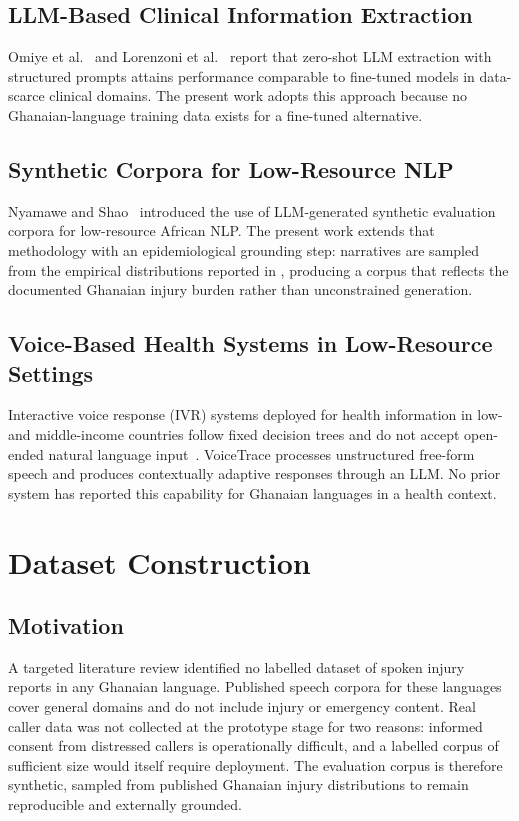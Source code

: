 \documentclass[conference]{IEEEtran}
\begin{document}
\subsection{LLM-Based Clinical Information Extraction}
Omiye et al.~\cite{omiye2025} and Lorenzoni et al.~\cite{lorenzoni2024}
report that zero-shot LLM extraction with structured prompts attains
performance comparable to fine-tuned models in data-scarce clinical
domains. The present work adopts this approach because no
Ghanaian-language training data exists for a fine-tuned alternative.

\subsection{Synthetic Corpora for Low-Resource NLP}
Nyamawe and Shao~\cite{nyamawe2026} introduced the use of
LLM-generated synthetic evaluation corpora for low-resource African
NLP. The present work extends that methodology with an
epidemiological grounding step: narratives are sampled from the
empirical distributions reported in \cite{boateng2019,opoku2025},
producing a corpus that reflects the documented Ghanaian injury
burden rather than unconstrained generation.

\subsection{Voice-Based Health Systems in Low-Resource Settings}
Interactive voice response (IVR) systems deployed for health
information in low- and middle-income countries follow fixed
decision trees and do not accept open-ended natural language
input~\cite{who_ghe}. VoiceTrace processes unstructured free-form
speech and produces contextually adaptive responses through an LLM.
No prior system has reported this capability for Ghanaian languages
in a health context.


\section{Dataset Construction}
\label{sec:data}

\subsection{Motivation}
A targeted literature review identified no labelled dataset of spoken
injury reports in any Ghanaian language. Published speech corpora for
these languages cover general domains and do not include injury or
emergency content. Real caller data was not collected at the
prototype stage for two reasons: informed consent from distressed
callers is operationally difficult, and a labelled corpus of
sufficient size would itself require deployment. The evaluation
corpus is therefore synthetic, sampled from published Ghanaian
injury distributions to remain reproducible and externally grounded.
\end{document}
